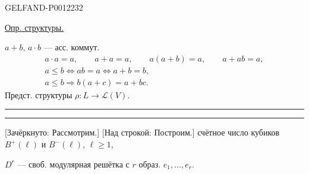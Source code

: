 \begin{GelfandAdjacentEvidence}{GELFAND-P001223}{2}


\underline{Опр. структуры.}

\(a+b\), \(a\cdot b\) --- асс. коммут.
\begin{equation*}
\begin{gathered}
a\cdot a=a,\qquad a+a=a,\qquad a(a+b)=a,\qquad a+ab=a,\\
a\leq b\Longleftrightarrow ab=a\Longleftrightarrow a+b=b,\\
a\leq b\Longrightarrow b(a+c)=a+bc.
\end{gathered}
\end{equation*}
Предст. структуры \(\rho:L\longrightarrow\mathcal L(V)\).

\begin{center}\rule{.9em}{.35pt}\quad\rule{.9em}{.35pt}\end{center}

[Зачёркнуто: Рассмотрим.] [Над строкой: Построим.] счётное число кубиков \(B^+(\ell)\) и \(B^-(\ell)\),
\(\ell\geq1\),
\end{GelfandAdjacentEvidence}


\(D^r\) --- своб. модулярная решётка с \(r\) образ. \(e_1,\ldots,e_r\).


